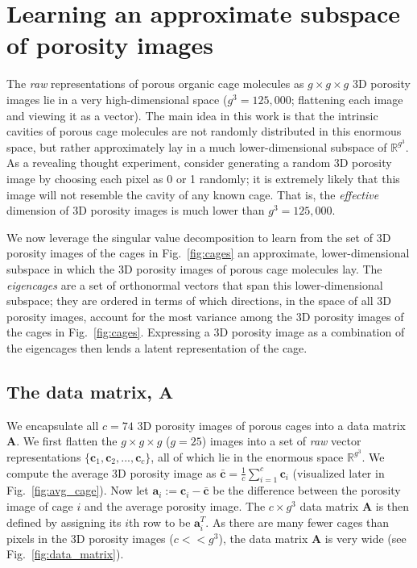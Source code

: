 \documentclass[journal=jacsat,manuscript=article,layout=traditional]{achemso}
\begin{document}
\section{Learning an approximate subspace of porosity images} 

The \emph{raw} representations of porous organic cage molecules as $g\times g \times g$ 3D porosity images lie in a very high-dimensional space ($g^3=125,000$; flattening each image and viewing it as a vector). The main idea in this work is that the intrinsic cavities of porous cage molecules are not randomly distributed in this enormous space, but rather approximately lay in a much lower-dimensional subspace of $\mathbb{R}^{g^3}$. As a revealing thought experiment, consider generating a random 3D porosity image by choosing each pixel as 0 or 1 {\color{red} randomly}; it is extremely likely that this image will not resemble the cavity of any known cage. That is, the \emph{effective} dimension of 3D porosity images is much lower than $g^3=125,000$. 

We now leverage the singular value decomposition \cite{muller2004singular,kalman1996singularly,strang1993introduction} to learn from the set of 3D porosity images of the cages in Fig.~\ref{fig:cages} an approximate, lower-dimensional subspace in which the 3D porosity images of porous cage molecules lay.
The \emph{eigencages} are a set of orthonormal vectors that span this lower-dimensional subspace; they are ordered in terms of which directions, in the space of all 3D porosity images, account for the most variance among the 3D porosity images of the cages in Fig.~\ref{fig:cages}. Expressing a 3D porosity image as a combination of the eigencages then lends a latent representation of the cage.

\subsection{The data matrix, $\mathbf{A}$} We encapsulate all $c=74$ 3D porosity images of porous cages into a data matrix $\mathbf{A}$. We first flatten the $g\times g\times g$ ($g=25$) images into a set of \emph{raw} vector representations $\{\mathbf{c}_1, \mathbf{c}_2, ..., \mathbf{c}_c\}$, all of which lie in the enormous space $\mathbb{R}^{g^3}$. 
We compute the average 3D porosity image as $\bar{\mathbf{c}}=\frac{1}{c}\sum_{i=1}^c  \mathbf{c}_i$ (visualized later in Fig.~\ref{fig:avg_cage}). Now let $\mathbf{a}_i:=\mathbf{c}_i-\bar{\mathbf{c}}$ be the difference between the porosity image of cage $i$ and the average porosity image. The $c \times g^3$ data matrix $\mathbf{A}$ is then defined by assigning its $i$th row to be $\mathbf{a}_i^T$. As there are many fewer cages than pixels in the 3D porosity images ($c<<g^3$), the data matrix $\mathbf{A}$ is very wide (see Fig.~\ref{fig:data_matrix}).
\end{document}
